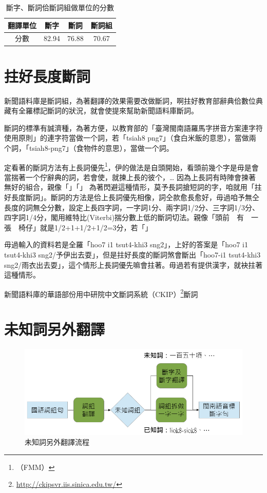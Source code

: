\begin{table}
\caption{斷字、斷詞佮斷詞組做單位的分數}%
\label{表：斷詞組、斷詞、斷字做單位的翻譯分數}
\centering
\begin{tabular}{c|ccc}
翻譯單位 & 斷字 & 斷詞 & 斷詞組\\
\hline
分數　& 82.94 & 76.88 & 70.67\\
\end{tabular}
\end{table}

\section{拄好長度斷詞}
\label{節：拄好長度斷詞}
新聞語料庫是斷詞組，為著翻譯的效果需要改做斷詞，啊拄好教育部辭典佮數位典藏有全羅標記斷詞的狀況，就會使提來幫助新聞語料庫斷詞。

斷詞的標準有誠濟種，為著方便，以教育部的「臺灣閩南語羅馬字拼音方案連字符使用原則」的連字符當做一个詞，若「tsiah8 png7」（食白米飯的意思），當做兩个詞，「tsiah8-png7」（食物件的意思），當做一个詞。

定看著的斷詞方法有上長詞優先\footnote{（FMM）}，伊的做法是自頭開始，看頭前幾个字是毋是會當揣著一个佇辭典的詞，若會使，就揀上長的彼个，…%
因為上長詞有時陣會揀著無好的組合，親像「」「」
為著閃避這種情形，莫予長詞搶短詞的字，咱就用「拄好長度斷詞」。斷詞的方法是佮上長詞優先相像，詞仝款愈長愈好，毋過咱予無仝長度的詞無仝分數，設定上長四字詞，一字詞1分、兩字詞1/2分、三字詞1/3分、四字詞1/4分，閣用維特比(Viterbi)揣分數上低的斷詞切法。親像「頭前　有　一張　椅仔」就是1/2+1+1/2+1/2=3分，若「」%

毋過輸入的資料若是全羅「hoo7 i1 tsut4-khi3 sng2」，上好的答案是「hoo7 i1 tsut4-khi3 sng2/予伊出去耍」，但是拄好長度的斷詞煞會斷出「hoo7-i1 tsut4-khi3 sng2/雨衣出去耍」，這个情形上長詞優先嘛會拄著。毋過若有提供漢字，就袂拄著這種情形。

新聞語料庫的華語部份用中研院中文斷詞系統（CKIP）\footnote{\url{http://ckipsvr.iis.sinica.edu.tw/}}斷詞

\section{未知詞另外翻譯}
\label{節：未知詞另外翻譯}

\begin{figure}
\centerline{\includegraphics[keepaspectratio,width=40em]{圖/未知詞另外翻譯}}
\caption{未知詞另外翻譯流程}
\label{未知詞另外翻譯}
\end{figure}

